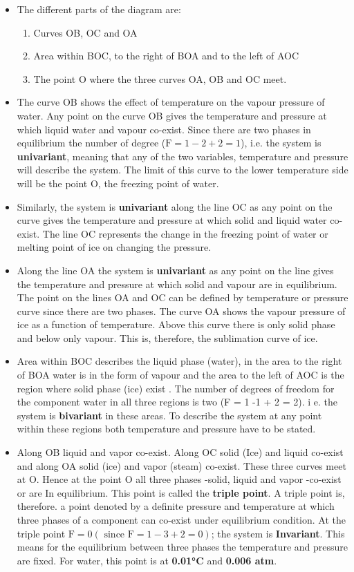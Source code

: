 \documentclass[a4paper,12pt,twocolumn]{article}
\begin{document}
\begin{itemize}
\item The different parts of the diagram are:
    \begin{enumerate}[label=(\alph*)]
    \item Curves OB, OC and OA 
    \item Area within BOC, to the right of BOA and to the left of AOC 
    \item The point O where the three curves OA, OB and OC meet.
    \end{enumerate}
\item The curve OB shows the effect of temperature on the vapour pressure of water. Any point on the curve OB gives the temperature and pressure at which liquid water and vapour co-exist. Since there are two phases in equilibrium the number of degree ($\mathrm{F =1 -2 + 2 =1}$), i.e. the system is \textbf{univariant}, meaning that any of the two variables, temperature and pressure will describe the system. The limit of this curve to the lower temperature side will be the point O, the freezing point of water. 
\item Similarly, the system is \textbf{univariant} along the line OC as any point on the curve gives the temperature and pressure at which solid and liquid water co-exist. The line OC represents the change in the freezing point of water or melting point of ice on changing the pressure.
\item Along the line OA the system is \textbf{univariant} as any point on the line gives the temperature and pressure at which solid and vapour are in equilibrium. The point on the lines OA and OC can be defined by temperature or pressure curve since there are two phases. The curve OA shows the vapour pressure of ice as a function of temperature. Above this curve there is only solid phase and below only vapour. This is, therefore, the sublimation curve of ice. 
\item Area within BOC describes the liquid phase (water), in the area to the right of BOA water is in the form of vapour and the area to the left of AOC is the region where solid phase (ice) exist . The number of degrees of freedom for the component water in all three regions is two (F = 1 -1 + 2 = 2). i e. the system is \textbf{bivariant} in these areas. To describe the system at any point within these regions both temperature and pressure have to be stated. 
\item Along OB liquid and vapor co-exist. Along OC solid (Ice) and liquid co-exist and along OA solid (ice) and vapor (steam) co-exist. These three curves meet at O. Hence at the point O all three phases -solid, liquid and vapor -co-exist or are In equilibrium. This point is called the \textbf{triple point}.  A triple point is, therefore. a point denoted by a definite pressure and temperature at which three phases of a component can co-exist under equilibrium condition. At the triple point $\mathrm{F = 0 (\text{ since } F = 1 -3 + 2 =0)}$; the system is \textbf{Invariant}. This means for the equilibrium between three phases the temperature and pressure are fixed. For water, this point is at \textbf{0.01°C} and \textbf{0.006 atm}.

\end{itemize}
\end{document}
